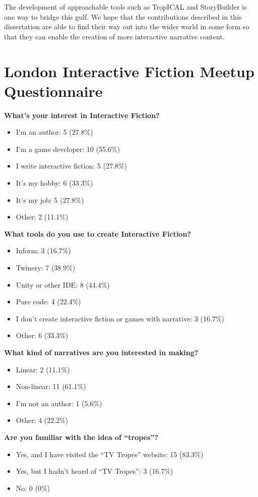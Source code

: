 \documentclass[11pt]{report}
\begin{document}
The development of approachable tools such as TropICAL and StoryBuilder is one way to bridge
this gulf. We hope that the contributions described in this dissertation are
able to find their way out into the wider world in some form so that they can
enable the creation of more interactive narrative content.


\appendix

\chapter{London Interactive Fiction Meetup Questionnaire}
\label{appendix:questionnaire}

\textbf{What's your interest in Interactive Fiction?}
\begin{itemize}
  \item I'm an author: 5 (27.8\%)
  \item I'm a game developer: 10 (55.6\%)
  \item I write interactive fiction: 5 (27.8\%)
  \item It's my hobby: 6 (33.3\%)
  \item It's my job: 5 (27.8\%)
  \item Other: 2 (11.1\%)
\end{itemize}
\textbf{What tools do you use to create Interactive Fiction?}
\begin{itemize}
  \item Inform: 3 (16.7\%)
  \item Twinery: 7 (38.9\%)
  \item Unity or other IDE: 8 (44.4\%)
  \item Pure code: 4 (22.4\%)
  \item I don't create interactive fiction or games with narrative: 3 (16.7\%)
  \item Other: 6 (33.3\%)
\end{itemize}
\textbf{What kind of narratives are you interested in making?}
\begin{itemize}
  \item Linear: 2 (11.1\%)
  \item Non-linear: 11 (61.1\%)
  \item I'm not an author: 1 (5.6\%)
  \item Other: 4 (22.2\%)
\end{itemize}
\textbf{Are you familiar with the idea of ``tropes''?}
\begin{itemize}
  \item Yes, and I have visited the ``TV Tropes'' website: 15 (83.3\%)
  \item Yes, but I hadn't heard of ``TV Tropes'': 3 (16.7\%)
  \item No: 0 (0\%)
\end{itemize}
\end{document}
